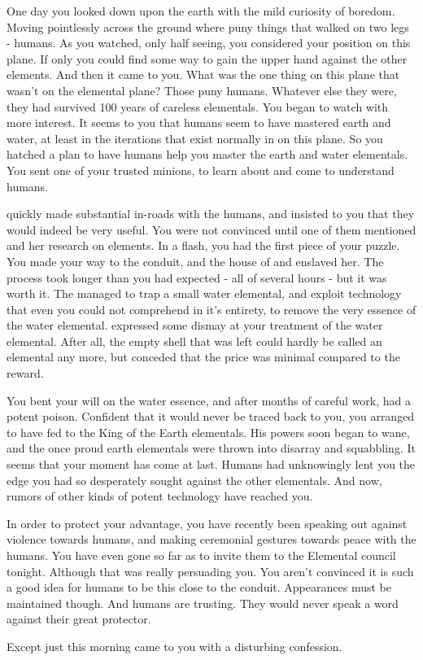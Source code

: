\documentclass[char]{elementals}
\begin{document}
One day you looked down upon the earth with the mild curiosity of boredom. Moving pointlessly across the ground where puny things that walked on two legs - humans. As you watched, only half seeing, you considered your position on this plane. If only you could find some way to gain the upper hand against the other elements. And then it came to you. What was the one thing on this plane that wasn't on the elemental plane? Those puny humans. Whatever else they were, they had survived 100 years of careless elementals. You began to watch with more interest. It seems to you that humans seem to have mastered earth and water, at least in the iterations that exist normally in on this plane.  So you hatched a plan to have humans help you master the earth and water elementals. You sent one of your trusted minions, \cNaturalist{} to learn about and come to understand  humans.

\cNaturalist{} quickly made substantial in-roads with the humans, and insisted to you that they would indeed be very useful. You were not convinced until one of them mentioned \cGranddaughter{} and her research on elements. In a flash, you had the first piece of your puzzle. You made your way to the conduit, and the house of \cGranddaughter{} and enslaved her. The process took longer than you had expected - all of several hours - but it was worth it. The \cGranddaughter{\kid} managed to trap a small water elemental, and exploit technology that even you could not comprehend in it's entirety, to remove the very essence of the water elemental. \cNaturalist{\MYname{}} expressed some dismay at your treatment of the water elemental. After all, the empty shell that was left could hardly be called an elemental any more, but \cNaturalist{\they} conceded that the price was minimal compared to the reward.

You bent your will on the water essence, and after months of careful work, had a potent poison. Confident that it would never be traced back to you, you arranged to have fed to the King of the Earth elementals. His powers soon began to wane, and the once proud earth elementals were thrown into disarray and squabbling. It seems that your moment has come at last. Humans had unknowingly lent you the edge you had so desperately sought against the other elementals. And now, rumors of other kinds of potent technology have reached you.

In order to protect your advantage, you have recently been speaking out against violence towards humans, and making ceremonial gestures towards peace with the humans. You have even gone so far as to invite them to the Elemental council tonight. Although that was really \cNaturalist{} persuading you. You aren't convinced it is such a good idea for humans to be this close to the conduit. Appearances must be maintained though. And humans are trusting. They would never speak a word against their great protector.

Except just this morning \cNaturalist{} came to you with a disturbing confession.  

\begin{itemz}[Goals]
	\item  
\end{itemz}

\begin{contacts}
	\contact{\cLeader{}}
	
\end{contacts} 
\end{document}
